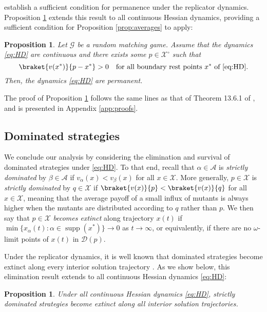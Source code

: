 \documentclass[reqno]{amsart}
\theoremstyle{plain}
\newtheorem{proposition}[theorem]{Proposition}
\theoremstyle{definition}
\theoremstyle{remark}
\numberwithin{equation}{section}
\numberwithin{theorem}{section}
\begin{document}
\cite{HS98} establish a sufficient condition for permanence under the replicator dynamics.
Proposition \ref{prop:perm} extends this result to all continuous Hessian dynamics, providing a sufficient condition for Proposition \ref{prop:averages} to apply:

\begin{proposition}
\label{prop:perm}
Let ${\mathcal{G}}$ be a random matching game.
Assume that the dynamics \eqref{eq:HD} are continuous and there exists some $p\in{{\mathcal{X}}^{\circ}}$ such that
\begin{equation}
\label{eq:perm-cond}
\braket{{v}({x^{\ast}})}{p - {x^{\ast}}}
	> 0
	\quad
	\text{for all boundary rest points ${x^{\ast}}$ of \eqref{eq:HD}}.
\end{equation}
Then, the dynamics \eqref{eq:HD} are permanent.
\end{proposition}

The proof of Proposition \ref{prop:perm} follows the same lines as that of Theorem 13.6.1 of \cite{HS98}, and is presented in Appendix \ref{app:proofs}.

\subsection{Dominated strategies}
\label{sec:dominated}

We conclude our analysis by considering the elimination and survival of dominated strategies under \eqref{eq:HD}.
To that end, recall that $\alpha\in{\mathcal{A}}$ is \emph{strictly dominated} by $\beta\in{\mathcal{A}}$ if ${v}_{\alpha}(x) < {v}_{\beta}(x)$ for all $x\in{\mathcal{X}}$.
More generally, $p\in{\mathcal{X}}$ is \emph{strictly dominated} by $q\in{\mathcal{X}}$ if $\braket{{v}(x)}{p} < \braket{{v}(x)}{q}$ for all $x\in{\mathcal{X}}$, meaning that the average payoff of a small influx of mutants is always higher when the mutants are distributed according to $q$ rather than $p$.
We then say that $p\in{\mathcal{X}}$ \emph{becomes extinct} along trajectory $x(t)$ if $\min\{x_{\alpha}(t):\alpha\in\operatorname{supp}({x^{\ast}})\} \to 0$ as $t\to\infty$, or equivalently, if there are no $\omega$-limit points of $x(t)$ in ${\mathcal{D}}(p)$.

Under the replicator dynamics, it is well known that dominated strategies become extinct along every interior solution trajectory \citep{Aki80}.
As we show below, this elimination result extends to all continuous Hessian dynamics \eqref{eq:HD}:

\begin{proposition}
\label{prop:dominated}
Under all continuous Hessian dynamics \eqref{eq:HD}, strictly dominated strategies become extinct along all interior solution trajectories.
\end{proposition}
\end{document}
